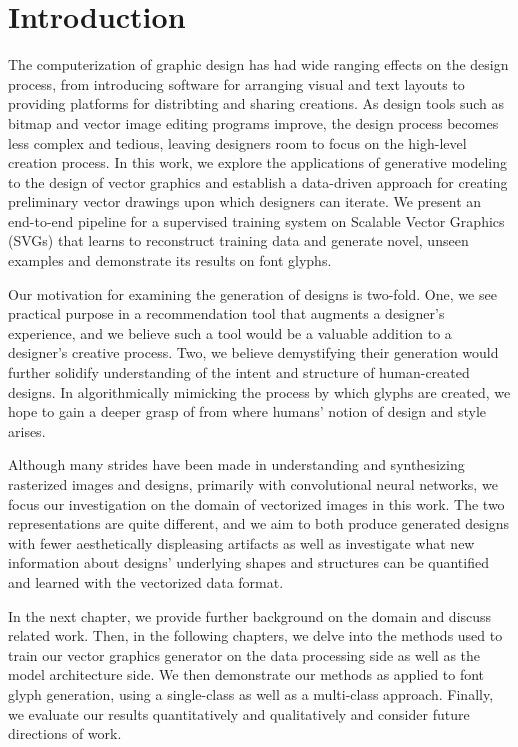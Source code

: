 \chapter{Introduction}

The computerization of graphic design has had wide ranging effects on the design process, from introducing software for arranging visual and text layouts to providing platforms for distribting and sharing creations.
As design tools such as bitmap and vector image editing programs improve, the design process becomes less complex and tedious, leaving designers room to focus on the high-level creation process.
In this work, we explore the applications of generative modeling to the design of vector graphics and establish a data-driven approach for creating preliminary vector drawings upon which designers can iterate.
We present an end-to-end pipeline for a supervised training system on Scalable Vector Graphics (SVGs) that learns to reconstruct training data and generate novel, unseen examples and demonstrate its results on font glyphs.

Our motivation for examining the generation of designs is two-fold.
One, we see practical purpose in a recommendation tool that augments a designer's experience, and we believe such a tool would be a valuable addition to a designer's creative process.
Two, we believe demystifying their generation would further solidify understanding of the intent and structure of human-created designs.
In algorithmically mimicking the process by which glyphs are created, we hope to gain a deeper grasp of from where humans' notion of design and style arises.

Although many strides have been made in understanding and synthesizing rasterized images and designs, primarily with convolutional neural networks, we focus our investigation on the domain of vectorized images in this work.
The two representations are quite different, and we aim to both produce generated designs with fewer aesthetically displeasing artifacts as well as investigate what new information about designs' underlying shapes and structures can be quantified and learned with the vectorized data format.

In the next chapter, we provide further background on the domain and discuss related work.
Then, in the following chapters, we delve into the methods used to train our vector graphics generator on the data processing side as well as the model architecture side.
We then demonstrate our methods as applied to font glyph generation, using a single-class as well as a multi-class approach.
Finally, we evaluate our results quantitatively and qualitatively and consider future directions of work.
